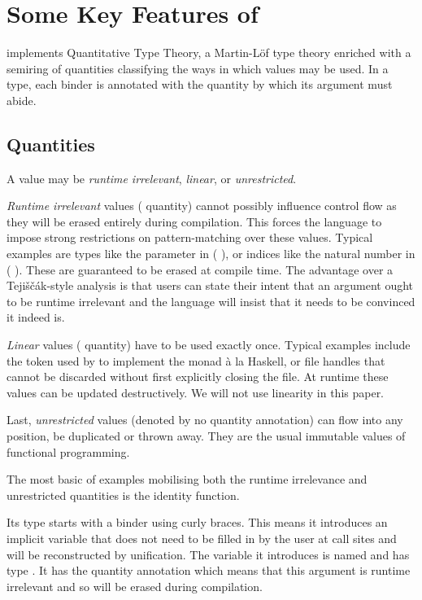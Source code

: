 
\section{Some Key Features of \idris}\label{sec:quantitativeTT}

\idris{} implements Quantitative Type Theory,
a Martin-Löf type theory enriched with a semiring of quantities
classifying the ways in which values may be used.
%
In a type, each binder is annotated with the quantity by which its
argument must abide.

\subsection{Quantities}

A value may be \emph{runtime irrelevant}, \emph{linear}, or \emph{unrestricted}.

\emph{Runtime irrelevant} values ( quantity) cannot possibly influence
control flow as they will be erased entirely during compilation.
%
This forces the language to impose strong restrictions on pattern-matching over these
values.
%
Typical examples are types like the  parameter in ( ),
or indices like the natural number  in
(  ).
%
These are guaranteed to be erased at compile time. The advantage over a Tejiščák-style
analysis is that users can state their intent that an argument ought to be runtime
irrelevant and the language will insist that it needs to be convinced it indeed is.

\emph{Linear} values ( quantity) have to be used exactly once.
%
Typical examples include the  token used by \idris{} to implement the
 monad à la Haskell, or file handles that cannot be discarded without first explicitly
closing the file.
%
At runtime these values can be updated destructively. We will not use linearity in this paper.

Last, \emph{unrestricted} values (denoted by no quantity annotation) can flow into any
position, be duplicated or thrown away.
%
They are the usual immutable values of functional programming.

The most basic of examples mobilising both the runtime irrelevance and unrestricted
quantities is the identity function.


Its type starts with a binder using curly braces.
%
This means it introduces an implicit variable that does not need to be filled in by
the user at call sites and will be reconstructed by unification.
%
The variable it introduces is named  and
has type . It has the  quantity annotation which means
that this argument is runtime irrelevant and so will be erased during compilation.

